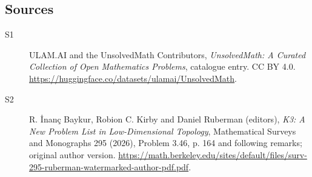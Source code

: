 \documentclass[11pt]{article}
\begin{document}
\subsection{Sources}
\begin{description}
\item[\hypertarget{source:statement:1}{S1}] ULAM.AI and the UnsolvedMath Contributors, \emph{UnsolvedMath: A Curated Collection of Open Mathematics Problems}, catalogue entry. CC BY 4.0. \url{https://huggingface.co/datasets/ulamai/UnsolvedMath}.
\item[\hypertarget{source:statement:2}{S2}] R. İnanç Baykur, Robion C. Kirby and Daniel Ruberman (editors), \emph{K3: A New Problem List in Low-Dimensional Topology}, Mathematical Surveys and Monographs 295 (2026), Problem 3.46, p. 164 and following remarks; original author version. \url{https://math.berkeley.edu/sites/default/files/surv-295-ruberman-watermarked-author-pdf.pdf}.
\end{description}
\label{end:statement}
\end{document}
